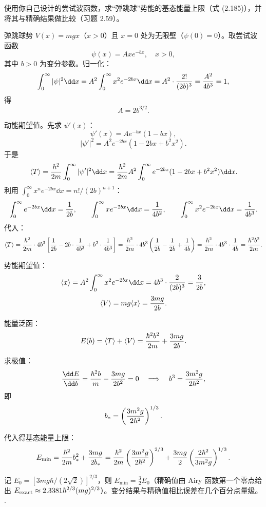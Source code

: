 \begin{question}
使用你自己设计的尝试波函数，求“弹跳球”势能的基态能量上限（式 (2.185)），并将其与精确结果做比较（习题 2.59）。

\par\smallskip
{}

\end{question}
\begin{solution}
弹跳球势 $V(x)=mgx$（$x>0$）且 $x=0$ 处为无限壁（$\psi(0)=0$）。取尝试波函数
\[
\psi(x)=Axe^{-bx},\quad x>0,
\]
其中 $b>0$ 为变分参数。归一化：
\[
\int_0^\infty|\psi|^2\dd x=A^2\int_0^\infty x^2e^{-2bx}\dd x
=A^2\cdot{2!\over(2b)^3}={A^2\over4b^3}=1,
\]
得
\[
A=2b^{3/2}.
\]

动能期望值。先求 $\psi'(x)$：
\[
\psi'(x)=Ae^{-bx}(1-bx),
\]
\[
|\psi'|^2=A^2e^{-2bx}(1-2bx+b^2x^2).
\]
于是
\[
\langle T\rangle={\hbar^2\over2m}\int_0^\infty|\psi'|^2\dd x
={\hbar^2\over2m}A^2\int_0^\infty e^{-2bx}(1-2bx+b^2x^2)\dd x.
\]
利用 $\int_0^\infty x^n e^{-2bx}\dd x=n!/(2b)^{n+1}$：
\[
\int_0^\infty e^{-2bx}\dd x={1\over2b},\qquad
\int_0^\infty x e^{-2bx}\dd x={1\over4b^2},\qquad
\int_0^\infty x^2 e^{-2bx}\dd x={1\over4b^3}.
\]
代入：
\[
\langle T\rangle={\hbar^2\over2m}\cdot4b^3\left[{1\over2b}-2b\cdot{1\over4b^2}+b^2\cdot{1\over4b^3}\right]
={\hbar^2\over2m}\cdot4b^3\left({1\over2b}-{1\over2b}+{1\over4b}\right)
={\hbar^2\over2m}\cdot4b^3\cdot{1\over4b}
={\hbar^2b^2\over2m}.
\]

势能期望值：
\[
\langle x\rangle=A^2\int_0^\infty x^2e^{-2bx}\dd x
=4b^3\cdot{2\over(2b)^3}={3\over2b},
\]
\[
\langle V\rangle=mg\langle x\rangle={3mg\over2b}.
\]

能量泛函：
\[
E(b)=\langle T\rangle+\langle V\rangle
={\hbar^2b^2\over2m}+{3mg\over2b}.
\]

求极值：
\[
{\dd E\over\dd b}={\hbar^2b\over m}-{3mg\over2b^2}=0
\quad\Longrightarrow\quad
b^3={3m^2g\over2\hbar^2},
\]
即
\[
b_*=\left({3m^2g\over2\hbar^2}\right)^{1/3}.
\]

代入得基态能量上限：
\[
E_{\min}={\hbar^2\over2m}b_*^2+{3mg\over2b_*}
={\hbar^2\over2m}\left({3m^2g\over2\hbar^2}\right)^{2/3}
+{3mg\over2}\left({2\hbar^2\over3m^2g}\right)^{1/3}.
\]

记 $E_0=[3mg\hbar/(2\sqrt2)]^{2/3}$，则 $E_{\min}=\frac32E_0$（精确值由 Airy 函数第一个零点给出 $E_{\rm exact}\approx2.3381\hbar^{2/3}(mg)^{2/3}$）。变分结果与精确值相比误差在几个百分点量级。
.
\end{solution}

